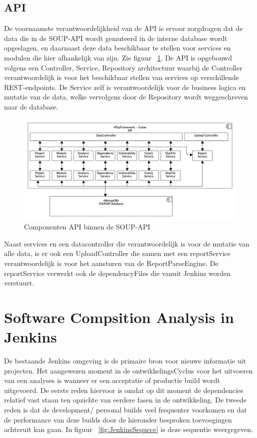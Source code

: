 \subsection{API}\label{subsec:api2}
De voornaamste verantwoordelijkheid van de API is ervoor zorgdragen dat de data die in de SOUP-API wordt gemuteerd in de interne database wordt opgeslagen, en daarnaast deze data beschikbaar te stellen voor services en modulen die hier afhankelijk van zijn. Zie figuur ~\ref{fig:SOUPAPI-API comps}. De API is opgebouwd volgens een Controller, Service, Repository architectuur waarbij de Controller verantwoordelijk is voor het beschikbaar stellen van services op verschillende REST-endpoints. De Service zelf is verantwoordelijk voor de business logica en mutatie van de data, welke vervolgens door de Repository wordt weggeschreven naar de database.
\begin{figure}[bth]
    \myfloatalign
    \includegraphics[width=15cm]{gfx/umlet/exports/API-ComponentsDiagram}
    \caption{Componenten API binnen de SOUP-API}
    \label{fig:SOUPAPI-API comps}
\end{figure}

Naast services en een datacontroller die verantwoordelijk is voor de mutatie van alle data, is er ook een UploadController die samen met een reportService verantwoordelijk is voor het aansturen van de ReportParseEngine. De reportService verwerkt ook de dependencyFiles die vanuit Jenkins worden verstuurt.

\section{Software Compsition Analysis in Jenkins}\label{sec:jenkins}
De bestaande Jenkins omgeving is de primaire bron voor nieuwe informatie uit projecten. Het aangewezen moment in de ontwikkelingsCyclus voor het uitvoeren van een analyses is wanneer er een acceptatie of productie build wordt uitgevoerd. De eerste reden hiervoor is omdat op dit moment de dependencies relatief vast staan ten opzichte van eerdere fasen in de ontwikkeling. De tweede reden is dat de development/ personal builds veel frequenter voorkomen en dat de performance van deze builds door de hieronder besproken toevoegingen achteruit kan gaan. In figuur ~\ref{fig:JenkinsSequece} is deze sequentie weergegeven.


